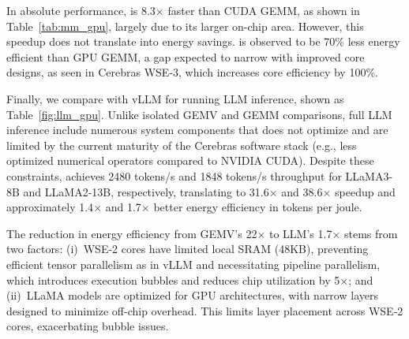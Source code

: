In absolute performance, \gemm is 8.3$\times$ faster than CUDA GEMM, as shown in Table~\ref{tab:mm_gpu}, largely due to its larger on-chip area. However, this speedup does not translate into energy savings. \gemm is observed to be 70\% less energy efficient than GPU GEMM, a gap expected to narrow with improved core designs, as seen in Cerebras WSE-3, which increases core efficiency by 100\%. 


\begin{table}[t]
  \centering
  \caption{Comparing \sys{}(WSE-2) with vLLM(A100) in end-to-end throughput and energy.}
  \vspace{-0.3cm}
  \label{fig:llm_gpu}%
\end{table}%

 Finally, we compare \sys with vLLM for running LLM inference, shown as Table~\ref{fig:llm_gpu}. Unlike isolated GEMV and GEMM comparisons, full LLM inference include numerous system components that \sys does not optimize and are limited by the current maturity of the Cerebras software stack (e.g., less optimized numerical operators compared to NVIDIA CUDA). Despite these constraints, \sys achieves 2480 tokens/s and 1848 tokens/s throughput for LLaMA3-8B and LLaMA2-13B, respectively, translating to 31.6$\times$ and 38.6$\times$ speedup and approximately 1.4$\times$ and 1.7$\times$ better energy efficiency in tokens per joule.

The reduction in energy efficiency from GEMV’s 22$\times$ to LLM’s 1.7$\times$ stems from two factors: (i)~WSE-2 cores have limited local SRAM (48KB), preventing efficient tensor parallelism as in vLLM and necessitating pipeline parallelism, which introduces execution bubbles and reduces chip utilization by 5$\times$; and (ii)~LLaMA models are optimized for GPU architectures, with narrow layers designed to minimize off-chip overhead. This limits layer placement across WSE-2 cores, exacerbating bubble issues. 